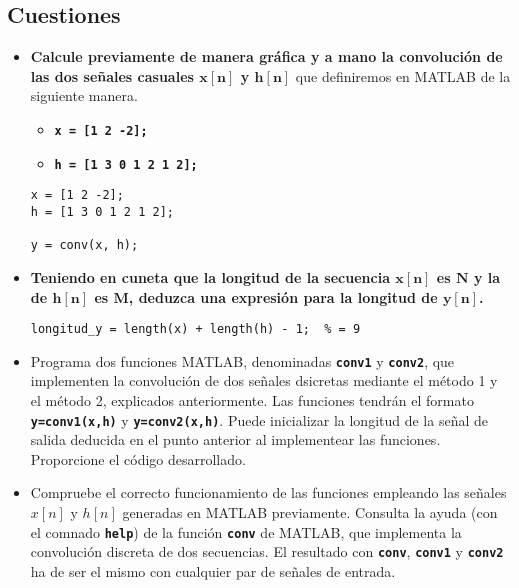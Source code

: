 \documentclass[12pt]{article}
\newcommand{\code}[1]{\texttt{\textbf{#1}}}
\begin{document}
\subsection*{Cuestiones}
\begin{itemize}[leftmargin=*]
	\item \textbf{Calcule previamente de manera gráfica y a mano la convolución de las dos señales casuales $\mathbf{x[n]}$ y $\mathbf{h[n]}$} que definiremos en MATLAB de la siguiente manera.
	\begin{itemize}[label=\textbullet]
		\item \code{x = [1 2 -2];}
		\item \code{h = [1 3 0 1 2 1 2];}
	\end{itemize}
	
\begin{lstlisting}
x = [1 2 -2];
h = [1 3 0 1 2 1 2];

y = conv(x, h);
\end{lstlisting}
	\item \textbf{Teniendo en cuneta que la longitud de la secuencia $\mathbf{x[n]}$ es $\mathbf{N}$ y la de $\mathbf{h[n]}$ es $\mathbf{M}$, deduzca una expresión para la longitud de $\mathbf{y[n]}$.}
	
	\begin{lstlisting}
longitud_y = length(x) + length(h) - 1;  % = 9
	\end{lstlisting}
	
	\item Programa dos funciones MATLAB, denominadas \code{conv1} y \code{conv2}, que implementen la convolución de dos señales dsicretas mediante el método 1 y el método 2, explicados anteriormente. Las funciones tendrán el formato \code{y=conv1(x,h)} y \code{y=conv2(x,h)}. Puede inicializar la longitud de la señal de salida deducida en el punto anterior al implementear las funciones. Proporcione el código desarrollado.
	\item Compruebe el correcto funcionamiento de las funciones empleando las señales $x[n]$ y $h[n]$ generadas en MATLAB previamente. Consulta la ayuda (con el comnado \code{help}) de la función \code{conv} de MATLAB, que implementa la convolución discreta de dos secuencias. El resultado con \code{conv}, \code{conv1} y \code{conv2} ha de ser el mismo con cualquier par de señales de entrada.
\end{itemize}
\end{document}
